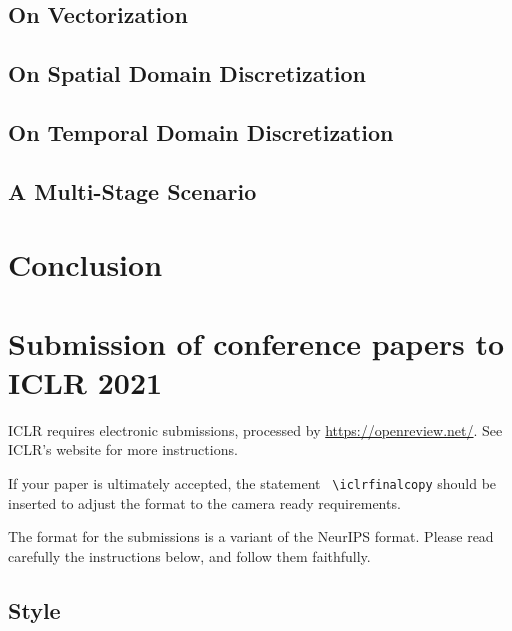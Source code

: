 \documentclass{article}
\begin{document}
\lipsum[26]

\subsection{On Vectorization}
\label{subsec: On Vectorization}

\lipsum[42]

\subsection{On Spatial Domain Discretization}
\label{subsec: On Spatial Domain Discretization}

\lipsum[54]

\subsection{On Temporal Domain Discretization}
\label{subsec: On Temporal Domain Discretization}

\lipsum[92]

\subsection{A Multi-Stage Scenario}
\label{subsec: A Multi-Stage Scenario}

\lipsum[84]

\section{Conclusion}
\label{sec: Conclusion}

\lipsum[20]

\section*{Submission of conference papers to ICLR 2021}

ICLR requires electronic submissions, processed by
\url{https://openreview.net/}. See ICLR's website for more instructions.

If your paper is ultimately accepted, the statement {\tt
  {\textbackslash}iclrfinalcopy} should be inserted to adjust the
format to the camera ready requirements.

The format for the submissions is a variant of the NeurIPS format.
Please read carefully the instructions below, and follow them
faithfully.

\subsection*{Style}
\end{document}
